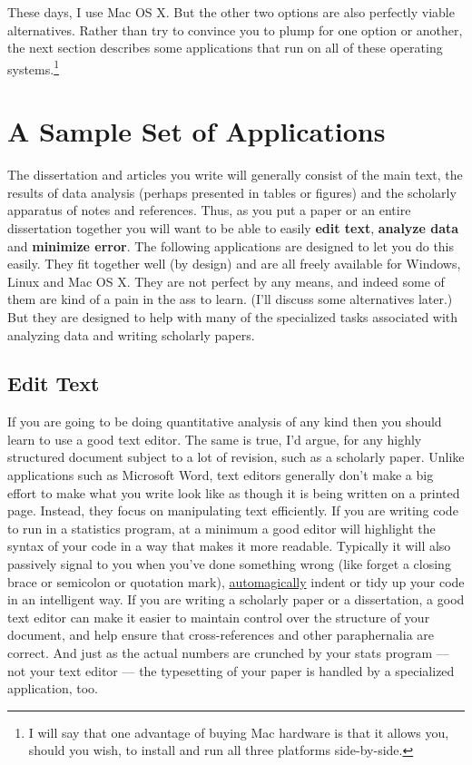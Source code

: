 \documentclass[11pt,article]{memoir}
\begin{document}
These days, I use Mac OS X. But the other two options are also perfectly viable alternatives. Rather than try to convince you to plump for one option or another, the next section describes some applications that run on all of these operating systems.\footnote{I will say that one advantage of buying Mac hardware is that it allows you, should you wish, to install and run all three platforms side-by-side.} 


\chapter{A Sample Set of Applications} 

The dissertation and articles you write will generally consist of the main text, the results of data analysis (perhaps presented in tables or figures) and the scholarly apparatus of notes and references. Thus, as you  put a paper or an entire dissertation together you will want to be able to easily \textbf{edit text}, \textbf{analyze data} and \textbf{minimize error}. The following applications are designed to let you do this easily. They fit together well (by design) and are all freely available for Windows, Linux and Mac OS X. They are not perfect by any means, and indeed some of them are kind of a pain in the ass to learn. (I'll discuss some alternatives later.) But they are designed to help with many of the specialized tasks associated with analyzing data and writing scholarly papers.                                                      

\section{Edit Text}
If you are going to be doing quantitative analysis of any kind then you should learn to use a good text editor. The same is true, I'd argue, for any highly structured document subject to a lot of revision, such as a scholarly paper. Unlike applications such as Microsoft Word, text editors generally don't make a big effort to make what you write look like as though it is being written on a printed page. Instead, they focus on manipulating text efficiently. If you are writing code to run in a statistics program, at a minimum a good editor will highlight the syntax of your code in a way that makes it more readable. Typically it will also passively signal to you when you've done something wrong (like forget a closing brace or semicolon or quotation mark), \href{http://en.wiktionary.org/wiki/automagical}{automagically} indent or tidy up your code in an intelligent way. If you are writing a scholarly paper or a dissertation, a good text editor can make it easier to maintain control over the structure of your document, and help ensure that cross-references and other paraphernalia are correct. And just as the actual numbers are crunched by your stats program --- not your text editor --- the typesetting of your paper is handled by a specialized application, too.
\end{document}
